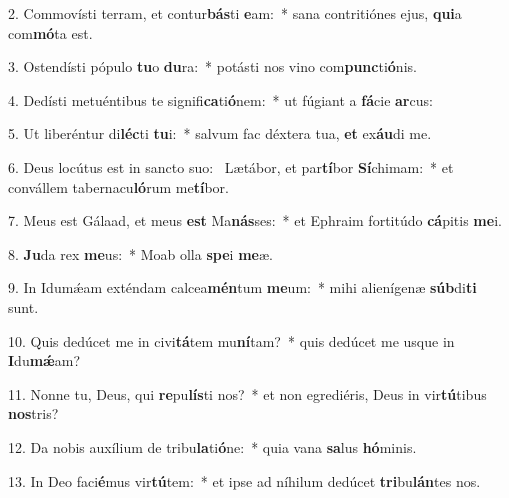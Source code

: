 2. Commovísti terram, et contur\textbf{bás}ti \textbf{e}am:~*  sana contritiónes ejus, \textbf{qui}a com\textbf{mó}ta est.\

3. Ostendísti pópulo \textbf{tu}o \textbf{du}ra:~*  potásti nos vino com\textbf{punc}ti\textbf{ó}nis.\

4. Dedísti metuéntibus te signifi\textbf{ca}ti\textbf{ó}nem:~*  ut fúgiant a \textbf{fá}cie \textbf{ar}cus:\

5. Ut liberéntur di\textbf{léc}ti \textbf{tu}i:~*  salvum fac déxtera tua, \textbf{et} ex\textbf{áu}di me.\

6. Deus locútus est in sancto suo: \dag\  Lætábor, et par\textbf{tí}bor \textbf{Sí}chimam:~*  et convállem tabernacu\textbf{ló}rum me\textbf{tí}bor.\

7. Meus est Gálaad, et meus \textbf{est} Ma\textbf{nás}ses:~*  et Ephraim fortitúdo \textbf{cá}pitis \textbf{me}i.\

8. \textbf{Ju}da rex \textbf{me}us:~*  Moab olla \textbf{spe}i \textbf{me}æ.\

9. In Idumǽam exténdam calcea\textbf{mén}tum \textbf{me}um:~*  mihi alienígenæ \textbf{súb}di\textbf{ti} sunt.\

10. Quis dedúcet me in civi\textbf{tá}tem mu\textbf{ní}tam?~*  quis dedúcet me usque in \textbf{I}du\textbf{mǽ}am?\

11. Nonne tu, Deus, qui \textbf{re}pu\textbf{lís}ti nos?~*  et non egrediéris, Deus in vir\textbf{tú}tibus \textbf{nos}tris?\

12. Da nobis auxílium de tribu\textbf{la}ti\textbf{ó}ne:~*  quia vana \textbf{sa}lus \textbf{hó}minis.\

13. In Deo faci\textbf{é}mus vir\textbf{tú}tem:~*  et ipse ad níhilum dedúcet \textbf{tri}bu\textbf{lán}tes nos.\

